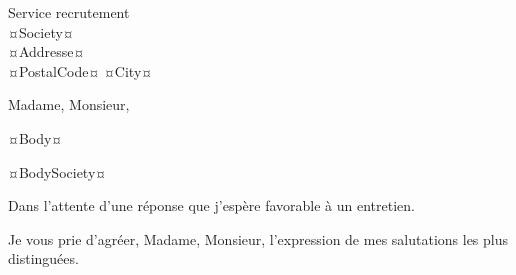 \documentclass[
    french,
    sender,
    paper=a4,
    version=last,
    fontsize=7.5pt,
    DIV=12,
    BCOR=0mm
]{scrlttr2}
\begin{document}




\begin{letter}{
    Service recrutement\\
    ¤Society¤\\
    ¤Addresse¤\\
    ¤PostalCode¤ ¤City¤
}

\opening{Madame, Monsieur,}


¤Body¤

¤BodySociety¤

Dans l’attente d’une réponse que j'espère favorable à un entretien.

\closing{Je vous prie d’agréer, Madame, Monsieur, l’expression de mes salutations les plus distinguées.\\}

\end{letter}
\end{document}
